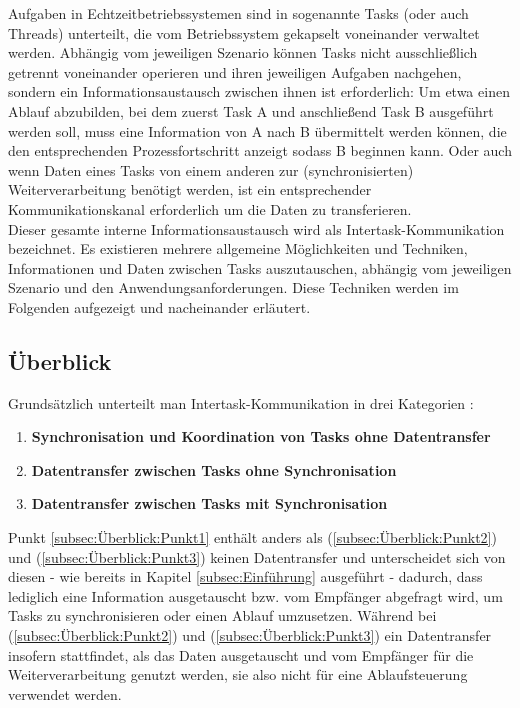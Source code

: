 \documentclass{llncs}
\begin{document}
Aufgaben in Echtzeitbetriebssystemen sind in sogenannte Tasks (oder auch Threads) unterteilt, die vom Betriebssystem gekapselt voneinander verwaltet werden. Abhängig vom jeweiligen Szenario können Tasks nicht ausschließlich getrennt voneinander operieren und ihren jeweiligen Aufgaben nachgehen, sondern ein Informationsaustausch zwischen ihnen ist erforderlich: Um etwa einen Ablauf abzubilden, bei dem zuerst Task A und anschließend Task B ausgeführt werden soll, muss eine Information von A nach B übermittelt werden können, die den entsprechenden Prozessfortschritt anzeigt sodass B beginnen kann. Oder auch wenn Daten eines Tasks von einem anderen zur (synchronisierten) Weiterverarbeitung benötigt werden, ist ein entsprechender Kommunikationskanal erforderlich um die Daten zu transferieren.\\

Dieser gesamte interne Informationsaustausch wird als Intertask-Kommunikation bezeichnet. Es existieren mehrere allgemeine Möglichkeiten und Techniken, Informationen und Daten zwischen Tasks auszutauschen, abhängig vom jeweiligen Szenario und den Anwendungsanforderungen. Diese Techniken werden im Folgenden aufgezeigt und nacheinander erläutert.

\subsection{Überblick}
\label{subsec:Überblick}
Grundsätzlich unterteilt man Intertask-Kommunikation in drei Kategorien \autocite[vgl.][79]{Cooling2017}:
\begin{enumerate}
	\setlength\itemsep{0.5em} %
	\item \textbf{Synchronisation und Koordination von Tasks ohne Datentransfer}  \label{subsec:Überblick:Punkt1}
	\item \textbf{Datentransfer zwischen Tasks ohne Synchronisation} \label{subsec:Überblick:Punkt2}
	\item \textbf{Datentransfer zwischen Tasks mit Synchronisation} \label{subsec:Überblick:Punkt3}
\end{enumerate}
Punkt \ref{subsec:Überblick:Punkt1} enthält anders als (\ref{subsec:Überblick:Punkt2}) und (\ref{subsec:Überblick:Punkt3}) keinen Datentransfer und unterscheidet sich von diesen - wie bereits in Kapitel \ref{subsec:Einführung} ausgeführt - dadurch, dass lediglich eine Information ausgetauscht bzw. vom Empfänger abgefragt wird, um Tasks zu synchronisieren oder einen Ablauf umzusetzen. Während bei (\ref{subsec:Überblick:Punkt2}) und (\ref{subsec:Überblick:Punkt3}) ein Datentransfer insofern stattfindet, als das Daten ausgetauscht und vom Empfänger für die Weiterverarbeitung genutzt werden, sie also nicht für eine Ablaufsteuerung verwendet werden. 
\end{document}
